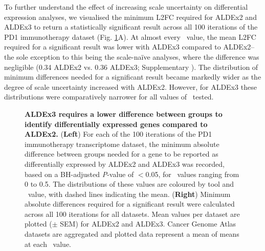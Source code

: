 \documentclass[10pt,letterpaper]{article}
\begin{document}
To further understand the effect of increasing scale uncertainty on differential expression analyses, we visualised the minimum L2FC required for ALDEx2 and ALDEx3 to return a statistically significant result across all 100 iterations of the PD1 immunotherapy dataset (Fig. \ref{fig:density}A). At almost every \textgamma~value, the mean L2FC required for a significant result was lower with ALDEx3 compared to ALDEx2-- the sole exception to this being the scale-na\"ive analyses, where the difference was negligible (0.34 ALDEx2 vs. 0.36 ALDEx3; Supplementary ). The distribution of minimum differences needed for a significant result became markedly wider as the degree of scale uncertainty increased with ALDEx2. However, for ALDEx3 these distributions were comparatively narrower for all values of \textgamma~tested.

\begin{figure}[H]
    \centering
    \caption{\textbf{ALDEx3 requires a lower difference between groups to identify differentially expressed genes compared to ALDEx2.} (\textbf{Left}) For each of the 100 iterations of the PD1 immunotherapy transcriptome dataset, the minimum absolute difference between groups needed for a gene to be reported as differentially expressed by ALDEx2 and ALDEx3 was recorded, based on a BH-adjusted \textit{P}-value of $<$0.05, for \textgamma~values ranging from 0 to 0.5. The distributions of these values are coloured by tool and \textgamma~value, with dashed lines indicating the mean. (\textbf{Right}) Minimum absolute differences required for a significant result were calculated across all 100 iterations for all datasets. Mean values per dataset are plotted ($\pm$ SEM) for ALDEx2 and ALDEx3. Cancer Genome Atlas datasets are aggregated and plotted data represent a mean of means at each \textgamma~value.}
    \label{fig:density}
\end{figure}
\end{document}
